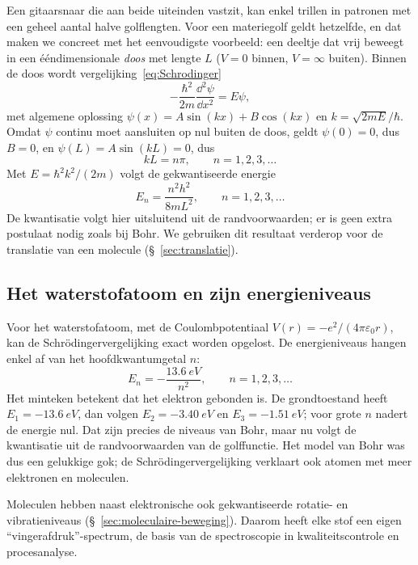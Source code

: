 Een gitaarsnaar die aan beide uiteinden vastzit, kan enkel trillen in patronen met een geheel aantal halve golflengten. Voor een materiegolf geldt hetzelfde, en dat maken we concreet met het eenvoudigste voorbeeld: een deeltje dat vrij beweegt in een ééndimensionale \emph{doos} met lengte $L$ ($V=0$ binnen, $V=\infty$ buiten). Binnen de doos wordt vergelijking~\eqref{eq:Schrodinger}
\[
-\frac{\hbar^2}{2m}\frac{\dd^2\psi}{\dd x^2} = E\psi,
\]
met algemene oplossing $\psi(x)=A\sin(kx)+B\cos(kx)$ en $k=\sqrt{2mE}/\hbar$. Omdat $\psi$ continu moet aansluiten op nul buiten de doos, geldt $\psi(0)=0$, dus $B=0$, en $\psi(L)=A\sin(kL)=0$, dus
\[
kL = n\pi, \qquad n=1,2,3,\ldots
\]
Met $E=\hbar^2k^2/(2m)$ volgt de gekwantiseerde energie
\begin{equation}
E_n = \frac{n^2h^2}{8mL^2}, \qquad n=1,2,3,\ldots
\label{eq:deeltje-in-doos}
\end{equation}
De kwantisatie volgt hier uitsluitend uit de randvoorwaarden; er is geen extra postulaat nodig zoals bij Bohr. We gebruiken dit resultaat verderop voor de translatie van een molecule (\S~\ref{sec:translatie}).

\subsection{Het waterstofatoom en zijn energieniveaus}
\label{sec:waterstofatoom}

Voor het waterstofatoom, met de Coulombpotentiaal $V(r)= -e^2/(4\pi\varepsilon_0 r)$, kan de Schr\"odingervergelijking exact worden opgelost. De energieniveaus hangen enkel af van het hoofdkwantumgetal $n$:
\begin{equation}
E_n = -\frac{\SI{13.6}{eV}}{n^2}, \qquad n = 1,2,3,\ldots
\end{equation}
Het minteken betekent dat het elektron gebonden is. De grondtoestand heeft $E_1 = \SI{-13.6}{eV}$, dan volgen $E_2 = \SI{-3.40}{eV}$ en $E_3 = \SI{-1.51}{eV}$; voor grote $n$ nadert de energie nul.
Dat zijn precies de niveaus van Bohr, maar nu volgt de kwantisatie uit de randvoorwaarden van de golffunctie. Het model van Bohr was dus een gelukkige gok; de Schr\"odingervergelijking verklaart ook atomen met meer elektronen en moleculen.

Moleculen hebben naast elektronische ook gekwantiseerde rotatie- en vibratieniveaus (\S~\ref{sec:moleculaire-beweging}). Daarom heeft elke stof een eigen ``vingerafdruk''-spectrum, de basis van de spectroscopie in kwaliteitscontrole en procesanalyse.

